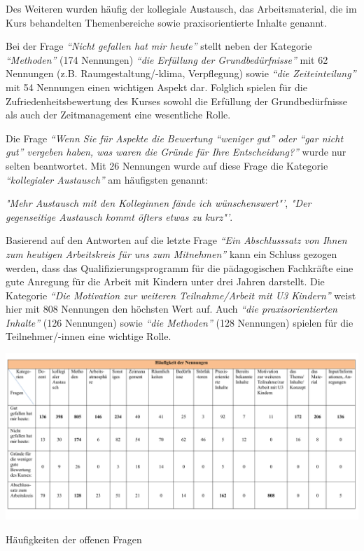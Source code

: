 \documentclass[12pt,a4paper]{article}
\begin{document}
Des Weiteren wurden häufig der kollegiale Austausch, das Arbeitsmaterial, die im Kurs behandelten Themenbereiche sowie praxisorientierte Inhalte genannt.

Bei der Frage \textit{"`Nicht gefallen hat mir heute"'} stellt neben der Kategorie \textit{"`Methoden"' }(174 Nennungen)\textit{ "`die Erfüllung der Grundbedürfnisse"'} mit 62 Nennungen (z.B. Raumgestaltung/-klima, Verpflegung) sowie \textit{"`die Zeiteinteilung"'} mit 54 Nennungen einen wichtigen Aspekt dar. Folglich spielen für die Zufriedenheitsbewertung des Kurses sowohl die Erfüllung der Grundbedürfnisse als auch der Zeitmanagement eine wesentliche Rolle. 

Die Frage \textit{"`Wenn Sie für Aspekte die Bewertung "`weniger gut"' oder "`gar nicht gut"' vergeben haben, was waren die Gründe für Ihre Entscheidung?"'} wurde nur selten beantwortet. Mit 26 Nennungen wurde auf diese Frage die Kategorie \textit{"`kollegialer Austausch"'} am häufigsten genannt:

\textit{ "Mehr Austausch mit den Kolleginnen fände ich wünschenswert"'},
\textit{ "Der gegenseitige Austausch kommt öfters etwas zu kurz"'}.

Basierend auf den Antworten auf die letzte Frage \textit{"`Ein Abschlusssatz von Ihnen zum heutigen Arbeitskreis für uns zum Mitnehmen"'} kann ein Schluss gezogen werden, dass das Qualifizierungsprogramm für die pädagogischen Fachkräfte eine gute Anregung für die Arbeit mit Kindern unter drei Jahren darstellt. Die Kategorie \textit{"`Die Motivation zur weiteren Teilnahme/Arbeit mit U3 Kindern"'} weist hier mit 808 Nennungen den höchsten Wert auf. Auch \textit{"`die praxisorientierten Inhalte"'} (126 Nennungen) sowie \textit{"`die Methoden"'} (128 Nennungen) spielen für die Teilnehmer/-innen eine wichtige Rolle. 
\begin{center}
\begin{table}[!ht]
\includegraphics[scale=0.71,angle=90]{tab04.pdf}
\caption{Häufigkeiten der offenen Fragen}
\label{tab.9}
\end{table}
\end{center}
\end{document}
